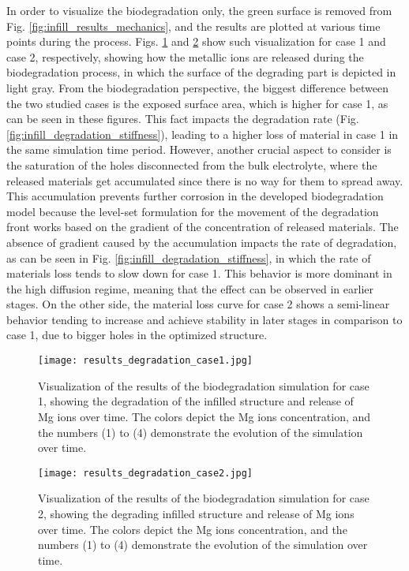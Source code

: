In order to visualize the biodegradation only, the green surface is removed from Fig. \ref{fig:infill_results_mechanics}, and the results are plotted at various time points during the process. Figs. \ref{fig:infill_results_degradation_case1} and \ref{fig:infill_results_degradation_case2} show such visualization for case 1 and case 2, respectively, showing how the metallic ions are released during the biodegradation process, in which the surface of the degrading part is depicted in light gray. From the biodegradation perspective, the biggest difference between the two studied cases is the exposed surface area, which is higher for case 1, as can be seen in these figures. This fact impacts the degradation rate (Fig. \ref{fig:infill_degradation_stiffness}), leading to a higher loss of material in case 1 in the same simulation time period. However, another crucial aspect to consider is the saturation of the holes disconnected from the bulk electrolyte, where the released materials get accumulated since there is no way for them to spread away. This accumulation prevents further corrosion in the developed biodegradation model because the level-set formulation for the movement of the degradation front works based on the gradient of the concentration of released materials. The absence of gradient caused by the accumulation impacts the rate of degradation, as can be seen in Fig. \ref{fig:infill_degradation_stiffness}, in which the rate of materials loss tends to slow down for case 1. This behavior is more dominant in the high diffusion regime, meaning that the effect can be observed in earlier stages. On the other side, the material loss curve for case 2 shows a semi-linear behavior tending to increase and achieve stability in later stages in comparison to case 1, due to bigger holes in the optimized structure.

\begin{figure}[h]
\centering
\medskip
\texttt{[image: results\_degradation\_case1.jpg]}
\caption[Visualization of the results of the biodegradation simulation for case 1]{Visualization of the results of the biodegradation simulation for case 1, showing the degradation of the infilled structure and release of Mg ions over time. The colors depict the Mg ions concentration, and the numbers (1) to (4) demonstrate the evolution of the simulation over time.} \label{fig:infill_results_degradation_case1}
\end{figure}


\begin{figure}[h]
\centering
\medskip
\texttt{[image: results\_degradation\_case2.jpg]}
\caption[Visualization of the results of the biodegradation simulation for case 2]{Visualization of the results of the biodegradation simulation for case 2, showing the degrading infilled structure and release of Mg ions over time. The colors depict the Mg ions concentration, and the numbers (1) to (4) demonstrate the evolution of the simulation over time.} \label{fig:infill_results_degradation_case2}
\end{figure}

